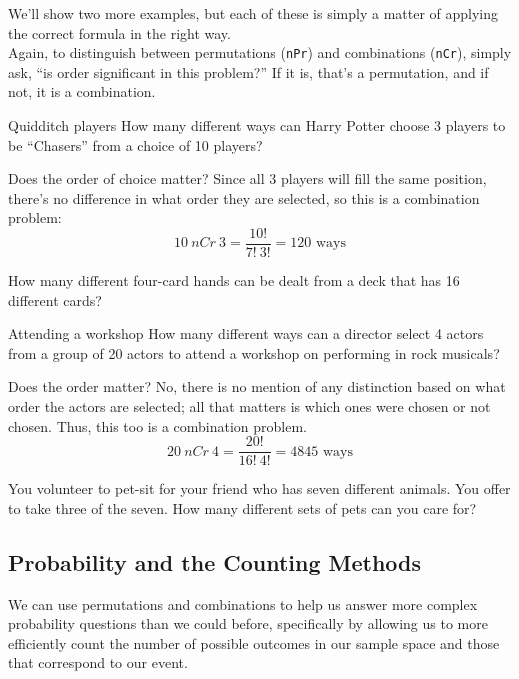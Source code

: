 We'll show two more examples, but each of these is simply a matter of applying the correct formula in the right way.\\

Again, to distinguish between permutations (\texttt{nPr}) and combinations (\texttt{nCr}), simply ask, ``is order significant in this problem?''  If it is, that's a permutation, and if not, it is a combination.
\vfill
\pagebreak

\begin{example}[https://www.youtube.com/watch?v=KQVo1KwtF1c&list=PLfmpjsIzhzts14-9s5QixRje97EI2oeMF&index=33]{Quidditch players}
How many different ways can Harry Potter choose 3 players to be ``Chasers''
from a choice of 10 players?

\sol
Does the order of choice matter?  Since all 3 players will fill the same position, there's no difference in what order they are selected, so this is a combination problem:
\[10\ nCr\ 3 = \dfrac{10!}{7! \ 3!} = \boxed{120 \textrm{ ways}}\]
\end{example}

\begin{try}
How many different four-card hands can be dealt from a deck that has 16
different cards?
\end{try}

\begin{example}[https://www.youtube.com/watch?v=LnFSPX3VKXM&list=PLfmpjsIzhzts14-9s5QixRje97EI2oeMF&index=34]{Attending a workshop}
How many different ways can a director select 4 actors from a group of 20
actors to attend a workshop on performing in rock musicals?

\sol
Does the order matter?  No, there is no mention of any distinction based on what order the actors are selected; all that matters is which ones were chosen or not chosen.  Thus, this too is a combination problem.
\[20\ nCr\ 4 = \dfrac{20!}{16! \ 4!} = \boxed{4845 \textrm{ ways}}\]
\end{example}

\begin{try}
You volunteer to pet-sit for your friend who has seven different animals. You
offer to take three of the seven. How many different sets of pets can you care for?
\end{try}

\subsection{Probability and the Counting Methods}
We can use permutations and combinations to help us answer more complex probability questions than we could before, specifically by allowing us to more efficiently count the number of possible outcomes in our sample space and those that correspond to our event.

